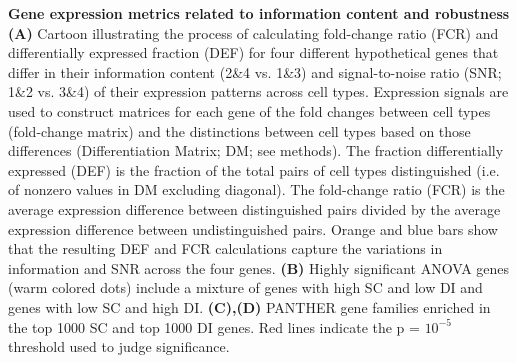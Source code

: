 \textbf{Gene expression metrics related to information content and robustness} \textbf{(A)} Cartoon illustrating the process of calculating fold-change ratio (FCR) and differentially expressed fraction (DEF) for four different hypothetical genes that differ in their information content (2\&4 vs. 1\&3) and signal-to-noise ratio (SNR; 1\&2 vs. 3\&4) of their expression patterns across cell types. Expression signals are used to construct matrices for each gene of the fold changes between cell types (fold-change matrix) and the distinctions between cell types based on those differences (Differentiation Matrix; DM; see methods). The fraction differentially expressed (DEF) is the fraction of the total pairs of cell types distinguished (i.e. of nonzero values in DM excluding diagonal). The fold-change ratio (FCR) is the average expression difference between distinguished pairs divided by the average expression difference between undistinguished pairs. Orange and blue bars show that the resulting DEF and FCR calculations capture the variations in information and SNR across the four genes. \textbf{(B)} Highly significant ANOVA genes (warm colored dots) include a mixture of genes with high SC and low DI and genes with low SC and high DI. \textbf{(C),(D)} PANTHER gene families enriched in the top 1000 SC and top 1000 DI genes. Red lines indicate the p = $10^{-5}$ threshold used to judge significance.